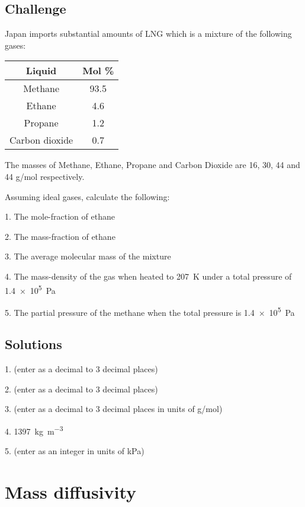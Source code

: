 \subsection*{Challenge}
Japan imports substantial amounts of LNG which is a mixture of the following gases:

\begin{tabular}[c]{|c|c|}
    \hline
    \textbf{Liquid} & \textbf{Mol \%}\\
    \hline
    Methane         & 93.5  \\
    Ethane          & 4.6   \\
    Propane         & 1.2   \\
    Carbon dioxide  & 0.7   \\
    \hline
\end{tabular}

The masses of Methane, Ethane, Propane and Carbon Dioxide are 16, 30, 44 and 44 g/mol respectively.

Assuming ideal gases, calculate the following:

1. The mole-fraction of ethane

2. The mass-fraction of ethane

3. The average molecular mass of the mixture

4. The mass-density of the gas when heated to \SI{207}{\kelvin} under a total pressure of \SI{1.4e5}{\pascal}

5. The partial pressure of the methane when the total pressure is \SI{1.4e5}{\pascal}

\subsection*{Solutions}

1. (enter as a decimal to 3 decimal places) 

2. (enter as a decimal to 3 decimal places) 

3. (enter as a decimal to 3 decimal places in units of g/mol) 

4. \SI{1397}{\kg\per\cubic\meter}

5. (enter as an integer in units of kPa) 




\newpage
\section{Mass diffusivity}


